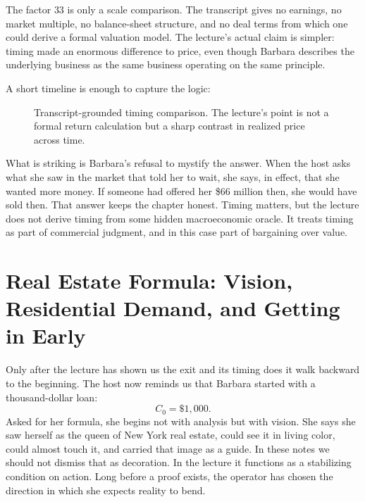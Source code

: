 \begin{remark}
The factor \(33\) is only a scale comparison. The transcript gives no earnings, no market multiple, no balance-sheet structure, and no deal terms from which one could derive a formal valuation model. The lecture's actual claim is simpler: timing made an enormous difference to price, even though Barbara describes the underlying business as the same business operating on the same principle.
\end{remark}

A short timeline is enough to capture the logic:
\begin{figure}[h]
\centering
{}
\caption{Transcript-grounded timing comparison. The lecture's point is not a formal return calculation but a sharp contrast in realized price across time.}
\end{figure}

What is striking is Barbara's refusal to mystify the answer. When the host asks what she saw in the market that told her to wait, she says, in effect, that she wanted more money. If someone had offered her \$66 million then, she would have sold then. That answer keeps the chapter honest. Timing matters, but the lecture does not derive timing from some hidden macroeconomic oracle. It treats timing as part of commercial judgment, and in this case part of bargaining over value.

\section{Real Estate Formula: Vision, Residential Demand, and Getting in Early}

Only after the lecture has shown us the exit and its timing does it walk backward to the beginning. The host now reminds us that Barbara started with a thousand-dollar loan:
\begin{equation}
C_0=\$1{,}000.
\end{equation}
Asked for her formula, she begins not with analysis but with vision. She says she saw herself as the queen of New York real estate, could see it in living color, could almost touch it, and carried that image as a guide. In these notes we should not dismiss that as decoration. In the lecture it functions as a stabilizing condition on action. Long before a proof exists, the operator has chosen the direction in which she expects reality to bend.

